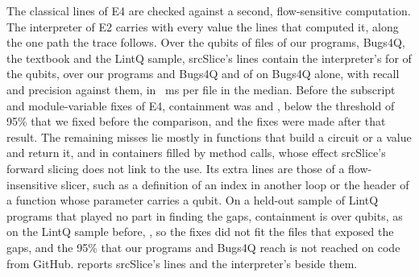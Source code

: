 The classical lines of E4 are checked against a second, flow-sensitive computation. The interpreter of E2
carries with every value the lines that computed it, along the one path the trace follows. Over the
\numSsQubits{} qubits of \numSsFiles{} files of our programs, Bugs4Q, the textbook and the LintQ sample,
srcSlice's lines contain the interpreter's for \numSsContainPct{} of the qubits, \numSsDevBugsContainPct{}
over our programs and Bugs4Q and \numSsBugsContain{} of \numSsBugsQubits{} on Bugs4Q alone, with recall
\numSsRecall{} and precision \numSsPrecision{} against them, in \numSsMedianMs{}~ms per file in the median.
Before the subscript and module-variable fixes of E4, containment was \numSsBeforeContainPct{} and \numSsBeforeDevBugsContainPct{}, below
the threshold of 95\% that we fixed before the comparison, and the fixes were made after that result. The
remaining misses lie mostly in functions that build a circuit or a value and return it, and in containers
filled by method calls, whose effect srcSlice's forward slicing does not link to the use. Its extra lines are those of a flow-insensitive slicer, such as a definition of an index in
another loop or the header of a function whose parameter carries a qubit. On a held-out sample of
\numSsHeldFiles{} LintQ programs that played no part in finding the gaps, containment is \numSsHeldContainPct{}
over \numSsHeldQubits{} qubits, as on the LintQ sample before, \numSsLintqContainPct{}, so the fixes did not fit
the files that exposed the gaps, and the 95\% that our programs and Bugs4Q reach is not reached on code from
GitHub. \tool{} reports srcSlice's lines and the interpreter's beside them.
